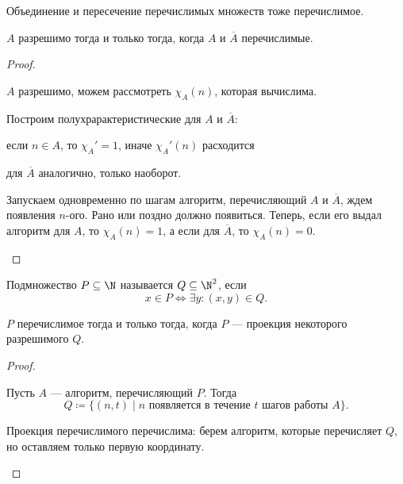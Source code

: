 
\begin{thm}
    Объединение и пересечение перечислимых множеств тоже перечислимое.
\end{thm}

\begin{thm}[Пост]
    $ A$ разрешимо тогда и только тогда, когда $ A$ и $ \overline{A}$ перечислимые.
\end{thm}
\begin{proof}
    $ $
    \begin{description}
        \item {} 
			$ A $ разрешимо, можем рассмотреть $ \chi_{A}(n)$, которая вычислима.

			Построим полухрарактеристические для $ A$ и $ \overline{A}$:
			\begin{iteimze}
			\item если $ n \in A$, то $ \chi_{A}' = 1$, иначе $ \chi_{A}'(n)$ расходится
			\item для $ \overline{A}$ аналогично, только наоборот.
			\end{iteimze}
        \item {} 
			Запускаем одновременно по шагам алгоритм, перечисляющий $ A$ и $ \overline{A}$, ждем появления $ n$-ого. Рано или поздно должно появиться. Теперь, если его выдал алгоритм для $ A$, то $ \chi_A(n) = 1$, а если для $\overline{A}$, то $ \chi_A(n) = 0$.
    \end{description} 
\end{proof}


\begin{defn}[Проекция]
	Подмножество $ P \subseteq \N$ называется  $ Q \subseteq \N^2$, если   \[
		x \in  P \Longleftrightarrow \exists y \colon  (x, y) \in  Q
	.\] 
\end{defn}
\begin{thm}[О проекции]
    $ P$ перечислимое тогда и только тогда, когда $ P$ --- проекция некоторого разрешимого $ Q$.
\end{thm}
\begin{proof}
    $ $
    \begin{description}
        \item {} 
			Пусть $ A$ --- алгоритм, перечисляющий $ P$. Тогда 
			\[
				Q \coloneqq \{(n, t) \mid n \text{ появляется в течение } t \text{ шагов работы } A\}
			.\] 
        \item {} 
			Проекция перечислимого перечислима: берем алгоритм, которые перечисляет $ Q$, но оставляем только первую координату.
    \end{description} 
\end{proof}

